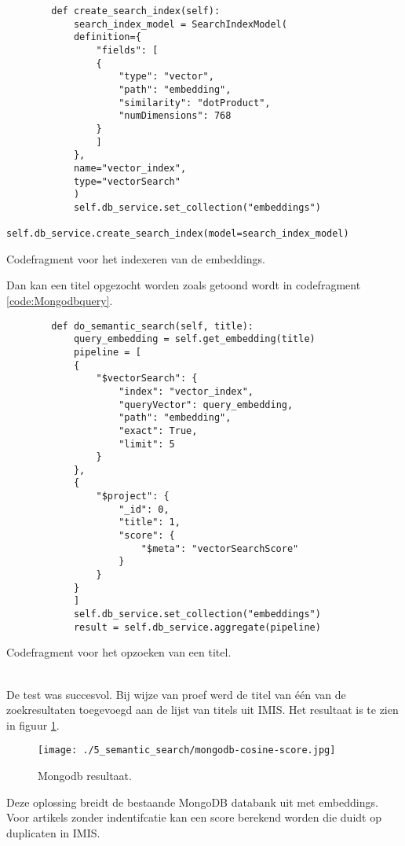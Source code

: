 \begin{listing}
    \begin{verbatim}
        def create_search_index(self):
            search_index_model = SearchIndexModel(
            definition={
                "fields": [
                {
                    "type": "vector",
                    "path": "embedding",
                    "similarity": "dotProduct",
                    "numDimensions": 768
                }
                ]
            },
            name="vector_index",
            type="vectorSearch"
            )
            self.db_service.set_collection("embeddings")
            self.db_service.create_search_index(model=search_index_model)
    \end{verbatim}
    \caption[Index codefragment]{Codefragment voor het indexeren van de embeddings.}
    \label{code:Mongodbindex}
\end{listing}
Dan kan een titel opgezocht worden zoals getoond wordt in codefragment \ref{code:Mongodbquery}.
\begin{listing}
    \begin{verbatim}
        def do_semantic_search(self, title):
            query_embedding = self.get_embedding(title)
            pipeline = [
            {
                "$vectorSearch": {
                    "index": "vector_index",
                    "queryVector": query_embedding,
                    "path": "embedding",
                    "exact": True,
                    "limit": 5
                }
            },
            {
                "$project": {
                    "_id": 0,
                    "title": 1,
                    "score": {
                        "$meta": "vectorSearchScore"
                    }
                }
            }
            ]
            self.db_service.set_collection("embeddings")
            result = self.db_service.aggregate(pipeline)
    \end{verbatim}
    \caption[Query codefragment]{Codefragment voor het opzoeken van een titel.}
    \label{code:Mongodbquery}
\end{listing}
\\
De test was succesvol. Bij wijze van proef werd de titel van één van de zoekresultaten toegevoegd aan de lijst van titels uit IMIS. Het resultaat is te zien in figuur \ref{fig:Mongodb}.
\begin{figure}
    \centering
    \texttt{[image: ./5\_semantic\_search/mongodb-cosine-score.jpg]}
    \caption[Mongodb resultaat.]{\label{fig:Mongodb}Mongodb resultaat.}
\end{figure}
Deze oplossing breidt de bestaande MongoDB databank uit met embeddings. Voor artikels zonder indentifcatie kan een score berekend worden die duidt op duplicaten in IMIS. 
